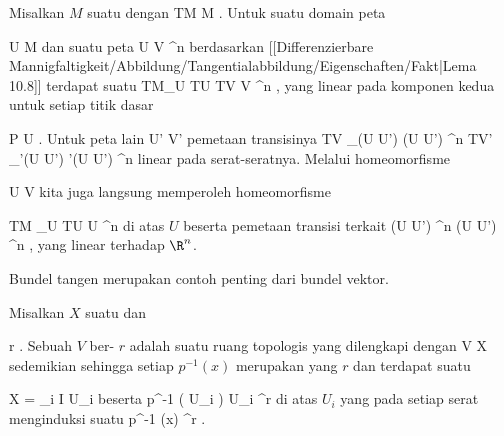 \setcounter{section}{12}


Misalkan $M$ suatu
dengan
 {TM} {M
} {.}
Untuk suatu domain peta

\mavergleichskette
{\vergleichskette
{ U
}
{ \subseteq }{ M
}
{  }{
}
{    }{
}
{   }{
}
}
{}{}{}
dan suatu peta
\maabbdisp {\alpha} { U } { V \subseteq \R^n
} {}
berdasarkan
[[Differenzierbare Mannigfaltigkeit/Abbildung/Tangentialabbildung/Eigenschaften/Fakt|Lema 10.8]]
terdapat suatu
 {TM\vert_U \cong TU} { TV \cong V \times \R^n
} {,}
yang linear pada komponen kedua untuk setiap titik dasar

\mavergleichskette
{\vergleichskette
{ P
}
{ \in }{ U
}
{  }{
}
{    }{
}
{   }{
}
}
{}{}{}
. Untuk peta lain
 {U'} {V'
} {}
pemetaan transisinya
\maabbdisp {} {TV \vert_{\alpha(U \cap U') }  \cong \alpha(U \cap U') \times \R^n } { TV' \vert_{\alpha'(U \cap U') }  \cong \alpha'(U \cap U') \times \R^n
} {}
linear pada serat-seratnya. Melalui homeomorfisme

\mavergleichskette
{\vergleichskette
{ U
}
{ \cong }{ V
}
{  }{
}
{    }{
}
{   }{
}
}
{}{}{}
kita juga langsung memperoleh homeomorfisme

\mavergleichskettedisp
{\vergleichskette
{ TM \vert_U \cong TU
}
{ \cong} { U \times \R^n
}
{ } {
}
{ } {
}
{ } {
}
}
{}{}{}
di atas $U$ beserta pemetaan transisi terkait
\maabbdisp {} {(U \cap U') \times \R^n } { (U \cap U') \times \R^n
} {,}
yang linear terhadap $\R^n$.

Bundel tangen merupakan contoh penting dari bundel vektor.

{}
{

Misalkan $X$ suatu
dan

\mavergleichskette
{\vergleichskette
{r
}
{ \in }{\N
}
{  }{
}
{    }{
}
{   }{
}
}
{}{}{.}
Sebuah
$V$ ber-
$r$ adalah suatu ruang topologis yang dilengkapi dengan
 { V } { X
} {}
sedemikian sehingga setiap
$p^{-1}(x)$ merupakan
yang
$r$ dan terdapat suatu

\mavergleichskette
{\vergleichskette
{X
}
{ = }{ \bigcup_{i \in I} U_i
}
{  }{
}
{    }{
}
{   }{
}
}
{}{}{}
beserta
 {p^{-1} \left(  U_i  \right) } { U_i \times \R^r
} {}
di atas $U_i$ yang pada setiap serat menginduksi suatu
 {p^{-1} (x) } { \R^r
} {}
.

}

